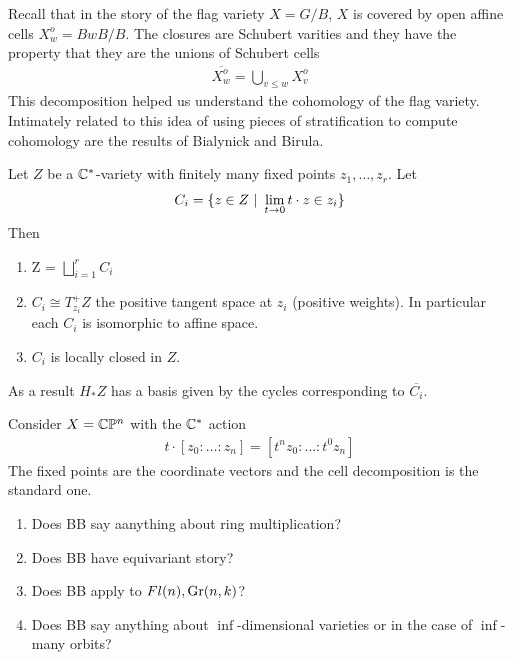 \documentclass[12pt]{article}
\begin{document}
Recall that in the story of the flag variety $X = G/B$, $X$ is covered by open affine cells $X_w^o = BwB/B$. The closures are
Schubert varities and they have the property that they are the unions of Schubert cells \begin{align*}
    \overline{X_w^o} = \bigcup_{v\leq w} X_v^o
\end{align*}
This decomposition helped us understand the cohomology of the flag variety. Intimately related to this idea of using pieces of 
stratification to compute cohomology are the results of Bialynick and Birula.

\begin{theorem}
    Let $Z$ be a $\mathbb{C}^*$-variety with finitely many fixed points $z_1,\dots,z_r$. Let \begin{align*}
        C_i = \{z\in Z\ \vert \  \lim_{t\to 0} t\cdot z \in z_i\}
    \end{align*} Then \begin{enumerate}
        \item Z = $\bigsqcup_{i=1}^r C_i$
        \item $C_i\cong T^+_{z_i}Z$ the positive tangent space at $z_i$ (positive weights). In particular each $C_i$ is isomorphic to affine space.
        \item $C_i$ is locally closed in $Z$.
    \end{enumerate} As a result $H_*Z$ has a basis given by the cycles corresponding to $\overline{C_i}$.
\end{theorem}

\begin{example}
    Consider $X = \mathbb{C}\mathbb{P}^n$ with the $\mathbb{C}^*$ action \begin{align*}
        t\cdot [z_0:\dots:z_n] = [t^n z_0:\dots:t^0z_n]
    \end{align*} The fixed points are the coordinate vectors and the cell decomposition is the standard one.
\end{example}

\begin{remark}
    \begin{enumerate}
        \item Does BB say aanything about ring multiplication?
        \item Does BB have equivariant story?
        \item Does BB apply to $Fl(n),\operatorname{Gr}(n,k)$?
        \item Does BB say anything about $\inf$-dimensional varieties or in the case of $\inf$-many orbits?
    \end{enumerate}
\end{remark}
\end{document}
